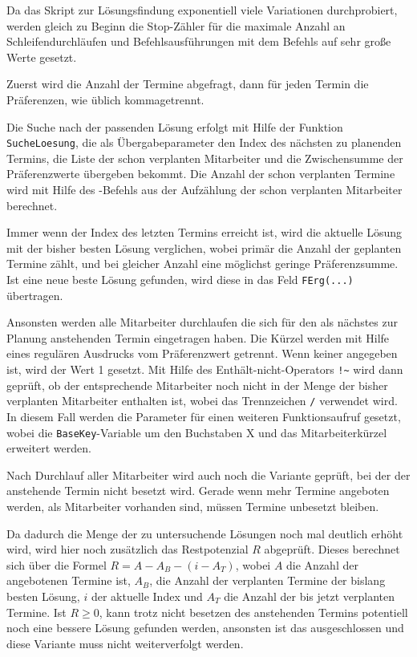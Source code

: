 Da das Skript zur Lösungsfindung exponentiell viele Variationen durchprobiert, werden gleich zu Beginn die Stop-Zähler für die maximale Anzahl an Schleifendurchläufen und Befehlsausführungen mit dem Befehls  auf sehr große Werte gesetzt.

Zuerst wird die Anzahl der Termine abgefragt, dann für jeden Termin die Präferenzen, wie üblich kommagetrennt.

Die Suche nach der passenden Lösung erfolgt mit Hilfe der Funktion \verb|SucheLoesung|, die als Übergabeparameter den Index des nächsten zu planenden Termins, die Liste der schon verplanten Mitarbeiter und die Zwischensumme der Präferenzwerte übergeben bekommt.  Die Anzahl der schon verplanten Termine wird mit Hilfe des -Befehls aus der Aufzählung der schon verplanten Mitarbeiter berechnet. 

Immer wenn der Index des letzten Termins erreicht ist, wird die aktuelle Lösung mit der bisher besten Lösung verglichen, wobei primär die Anzahl der geplanten Termine zählt, und bei gleicher Anzahl eine möglichst geringe Präferenzsumme. Ist eine neue beste Lösung gefunden, wird diese in das Feld \verb|FErg(...)| übertragen.

Ansonsten werden alle Mitarbeiter durchlaufen die sich für den als nächstes zur Planung anstehenden Termin eingetragen haben. Die Kürzel werden mit Hilfe eines regulären Ausdrucks vom Präferenzwert getrennt. Wenn keiner angegeben ist, wird der Wert 1 gesetzt. Mit Hilfe des Enthält-nicht-Operators \verb|!~| wird dann geprüft, ob der entsprechende Mitarbeiter noch nicht in der Menge der bisher verplanten Mitarbeiter enthalten ist, wobei das Trennzeichen \verb|/| verwendet wird. In diesem Fall werden die Parameter für einen weiteren Funktionsaufruf gesetzt, wobei die \verb|BaseKey|-Variable um den Buchstaben X und das Mitarbeiterkürzel erweitert werden.

Nach Durchlauf aller Mitarbeiter wird auch noch die Variante geprüft, bei der der anstehende Termin nicht besetzt wird. Gerade wenn mehr Termine angeboten werden, als Mitarbeiter vorhanden sind, müssen Termine unbesetzt bleiben.

Da dadurch die Menge der zu untersuchende Lösungen noch mal deutlich erhöht wird, wird hier noch zusätzlich das Restpotenzial $R$ abgeprüft. Dieses berechnet sich über die Formel $R=A-A_B-(i-A_T)$, wobei $A$ die Anzahl der angebotenen Termine ist, $A_B$, die Anzahl der verplanten Termine der bislang besten Lösung, $i$ der aktuelle Index und $A_T$ die Anzahl der bis jetzt verplanten Termine. Ist $R\ge0$, kann trotz nicht besetzen des anstehenden Termins potentiell noch eine bessere Lösung gefunden werden, ansonsten ist das ausgeschlossen und diese Variante muss nicht weiterverfolgt werden.

